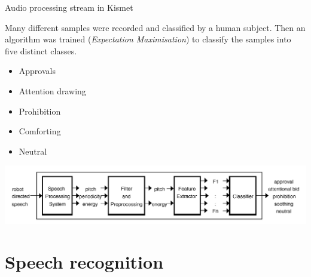 \documentclass[compress]{beamer}
\begin{document}
\begin{frame}{Audio processing stream in Kismet}

    Many different samples were recorded and classified by a human subject.
    Then an algorithm was trained (\emph{Expectation Maximisation}) to classify the
    samples into five distinct classes.

    \begin{itemize}
        \item Approvals
        \item Attention drawing
        \item Prohibition
        \item Comforting
        \item Neutral
    \end{itemize}

    \begin{center}
        \includegraphics[width=\linewidth]{kismet-audio-processing}
    \end{center}

\end{frame}



\section{Speech recognition}
\end{document}
